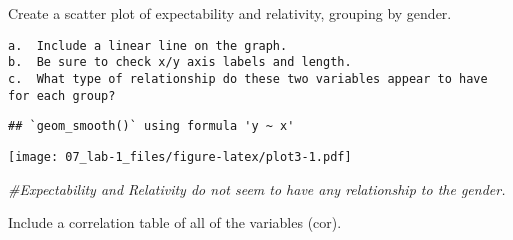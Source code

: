 \documentclass[
]{article}
\newenvironment{Shaded}{\begin{snugshade}}{\end{snugshade}}
\newcommand{\CommentTok}[1]{\textcolor[rgb]{0.56,0.35,0.01}{\textit{#1}}}
\newcommand{\DataTypeTok}[1]{\textcolor[rgb]{0.13,0.29,0.53}{#1}}
\newcommand{\KeywordTok}[1]{\textcolor[rgb]{0.13,0.29,0.53}{\textbf{#1}}}
\newcommand{\NormalTok}[1]{#1}
\newcommand{\OperatorTok}[1]{\textcolor[rgb]{0.81,0.36,0.00}{\textbf{#1}}}
\newcommand{\OtherTok}[1]{\textcolor[rgb]{0.56,0.35,0.01}{#1}}
\newcommand{\StringTok}[1]{\textcolor[rgb]{0.31,0.60,0.02}{#1}}
\begin{document}
Create a scatter plot of expectability and relativity, grouping by
gender.

\begin{verbatim}
a.  Include a linear line on the graph. 
b.  Be sure to check x/y axis labels and length.
c.  What type of relationship do these two variables appear to have for each group?
\end{verbatim}

\begin{Shaded}
\end{Shaded}

\begin{verbatim}
## `geom_smooth()` using formula 'y ~ x'
\end{verbatim}

\texttt{[image: 07\_lab-1\_files/figure-latex/plot3-1.pdf]}

\begin{Shaded}
\begin{Highlighting}[]
\CommentTok{#Expectability and Relativity do not seem to have any relationship to the gender.}
\end{Highlighting}
\end{Shaded}

Include a correlation table of all of the variables (cor).
\end{document}
